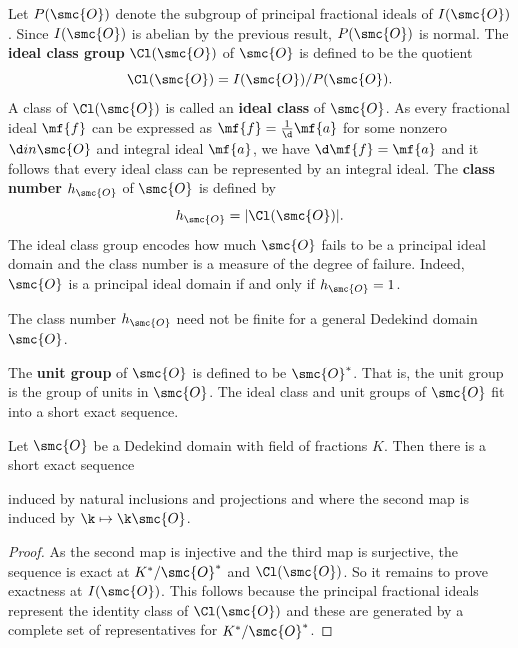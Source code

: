 \documentclass[12pt]{article}
\begin{document}
      Let \(P(\smc{O})\) denote the subgroup of principal fractional ideals of \(I(\smc{O})\). Since \(I(\smc{O})\) is abelian by the previous result, \(P(\smc{O})\) is normal. The \textbf{ideal class group} \(\Cl(\smc{O})\) of \(\smc{O}\) is defined to be the quotient
      \[
        \Cl(\smc{O}) = I(\smc{O})/P(\smc{O}).
      \]
      A class of \(\Cl(\smc{O})\) is called an \textbf{ideal class} of \(\smc{O}\). As every fractional ideal \(\mf{f}\) can be expressed as \(\mf{f} = \frac{1}{\d}\mf{a}\) for some nonzero \(\d in \smc{O}\) and integral ideal \(\mf{a}\), we have \(\d\mf{f} = \mf{a}\) and it follows that every ideal class can be represented by an integral ideal. The \textbf{class number} \(h_{\smc{O}}\) of \(\smc{O}\) is defined by
      \[
        h_{\smc{O}} = |\Cl(\smc{O})|.
      \]
      The ideal class group encodes how much \(\smc{O}\) fails to be a principal ideal domain and the class number is a measure of the degree of failure. Indeed, \(\smc{O}\) is a principal ideal domain if and only if \(h_{\smc{O}} = 1\).

      \begin{remark}\label{rem:general_class_number_not_finite}
        The class number \(h_{\smc{O}}\) need not be finite for a general Dedekind domain \(\smc{O}\).
      \end{remark}
      
      The \textbf{unit group} of \(\smc{O}\) is defined to be \(\smc{O}^{\ast}\). That is, the unit group is the group of units in \(\smc{O}\). The ideal class and unit groups of \(\smc{O}\) fit into a short exact sequence.

      \begin{proposition}\label{prop:ideal_class_group_exact_sequence}
        Let \(\smc{O}\) be a Dedekind domain with field of fractions \(K\). Then there is a short exact sequence
        \begin{center}
        \end{center}
        induced by natural inclusions and projections and where the second map is induced by \(\k \mapsto \k\smc{O}\).
      \end{proposition}
      \begin{proof}
        As the second map is injective and the third map is surjective, the sequence is exact at \(K^{\ast}/\smc{O}^{\ast}\) and \(\Cl(\smc{O})\). So it remains to prove exactness at \(I(\smc{O})\). This follows because the principal fractional ideals represent the identity class of \(\Cl(\smc{O})\) and these are generated by a complete set of representatives for \(K^{\ast}/\smc{O}^{\ast}\).
      \end{proof}
\end{document}

